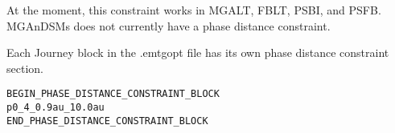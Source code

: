 \documentclass[11pt]{article}
\begin{document}
At the moment, this constraint works in \ac{MGALT}, \ac{FBLT}, \ac{PSBI}, and \ac{PSFB}. \ac{MGAnDSMs} does not currently have a phase distance constraint.

Each Journey block in the .emtgopt file has its own phase distance constraint section.

\begin{verbatim}
BEGIN_PHASE_DISTANCE_CONSTRAINT_BLOCK
p0_4_0.9au_10.0au
END_PHASE_DISTANCE_CONSTRAINT_BLOCK
\end{verbatim}


%
%
\end{document}
